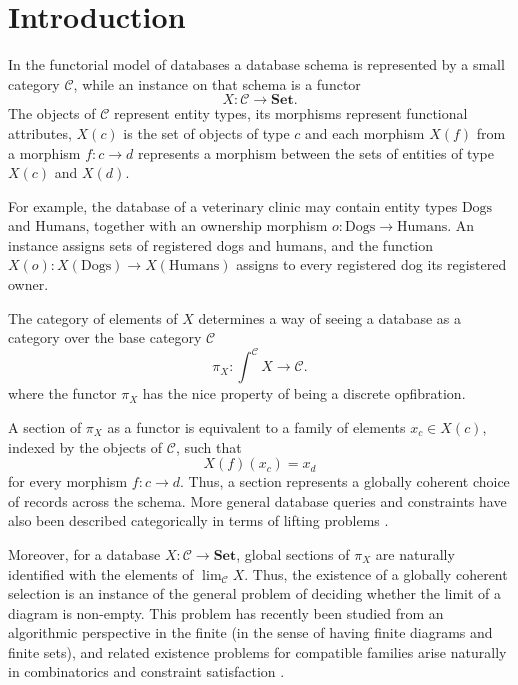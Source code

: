 \documentclass[12pt]{amsart}
\theoremstyle{definition}
\theoremstyle{remark}
\numberwithin{figure}{section}%
\newcommand{\CC}{\mathcal{C}}
\newcommand{\Sets}{\mathbf{Set}}
\begin{document}
\maketitle


\section*{Introduction}

In the functorial model of databases \cite[chapter 3]{SevenSketches} a database schema is represented by a
small category \(\CC\), while an instance on that schema is a functor
\[
X\colon\CC\longrightarrow\Sets.
\] The objects of \(\CC\) represent
entity types, its morphisms represent functional attributes, \(X(c)\) is the set of objects of type \(c\) and each morphism \(X(f)\) from a morphism \(f \colon c \to d\) represents a morphism between the sets of entities of type $X(c)$ and $X(d)$.

For example, the database of a veterinary clinic may contain entity types \(\mathrm{Dogs}\) and \(\mathrm{Humans}\), together with an ownership
morphism \(o\colon\mathrm{Dogs}\to\mathrm{Humans}\). An instance assigns
sets of registered dogs and humans, and the function
\(X(o)\colon X(\mathrm{Dogs})\to X(\mathrm{Humans})\) assigns to every
registered dog its registered owner.

The category of
elements of \(X\) determines a way of seeing a database as a category over the base category \(\CC\)
\[
\pi_X\colon\int^\CC X\longrightarrow\CC.
\]
where the functor \(\pi_X\) has the nice property of being a discrete opfibration.

A section of \(\pi_X\) as a functor is equivalent to a family of elements
\(x_c\in X(c)\), indexed by the objects of \(\CC\), such that
\[
X(f)(x_c)=x_d
\]
for every morphism \(f\colon c\to d\). Thus, a section represents a
globally coherent choice of records across the schema. More general
database queries and constraints have also been described categorically in
terms of lifting problems
\cite{SpivakDataMigration,SpivakDatabaseQueries}.

Moreover, for a database \(X\colon\CC\to\Sets\), global sections of
\(\pi_X\) are naturally identified with the elements of \(\lim_\CC X\).
Thus, the existence of a globally coherent selection is an instance of the
general problem of deciding whether the limit of a diagram is
non-empty. This problem has recently been studied from an algorithmic
perspective \cite{althaus2026parameterizedalgorithmtestinglimit} in the finite (in the sense of having finite diagrams and finite sets), and related existence problems for
compatible families arise naturally in combinatorics and constraint
satisfaction \cite{hadek2026categoricalperspectiveconstraintsatisfaction}. 
\end{document}
